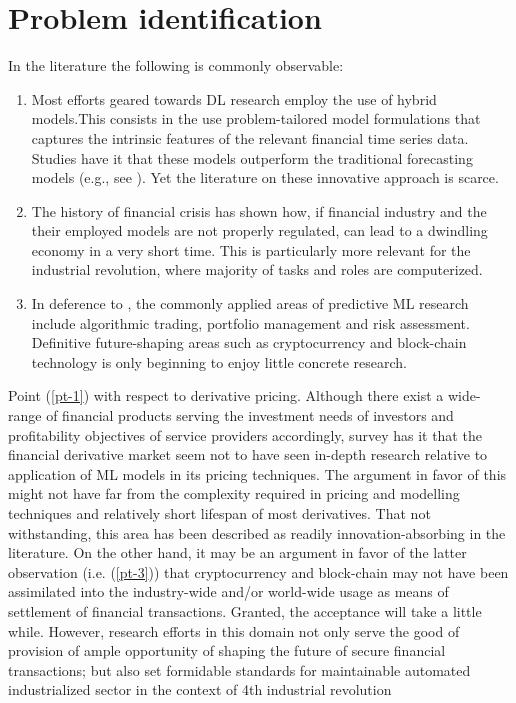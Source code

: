 \documentclass[a4paper,11pt]{scrartcl}
\newcommand{\eg}{e.g.}
\begin{document}
\section{Problem identification}
In the literature the following is commonly observable:
\begin{enumerate}
    \item \label{pt-1} Most efforts geared towards DL research employ the use of hybrid models.This consists in the use problem-tailored model formulations that captures the intrinsic features of the relevant financial time series data. Studies have it that these models outperform the traditional forecasting models (\eg, see \citep{ozbayoglu2020deep}). Yet the literature on these innovative approach is scarce.
    \item \label{pt-2} The history of financial crisis has shown how, if financial industry and the their employed models are not properly regulated, can lead to a dwindling economy in a very short time. This is particularly more relevant for the industrial revolution, where majority of tasks and roles are computerized.
    \item \label{pt-3} In deference to \citep{sezer2020financial}, the commonly applied areas of predictive ML research include algorithmic trading, portfolio management and risk assessment. Definitive future-shaping areas such as cryptocurrency and block-chain technology is only beginning to enjoy little concrete research.
\end{enumerate}

Point (\ref{pt-1}) with respect to derivative pricing. Although there exist a wide-range of financial products serving the investment needs of investors and profitability objectives of service providers accordingly, survey has it that the financial derivative market seem not to have seen in-depth research relative to application of ML models in its pricing techniques. The argument in favor of this might not have far from the complexity required in pricing and modelling techniques and relatively short lifespan of most derivatives. That not withstanding, this area has been described as readily innovation-absorbing in the literature.
\newline
On the other hand, it may be an argument in favor of the latter observation (i.e. (\ref{pt-3})) that cryptocurrency and block-chain may not have been assimilated into the industry-wide and/or world-wide usage as means of settlement of financial transactions. Granted, the acceptance will take a little while. However, research efforts in this domain not only serve the good of provision of ample opportunity of shaping the future of secure financial transactions; but also set formidable standards for maintainable automated  industrialized sector in the context of 4th industrial revolution
%
\end{document}
